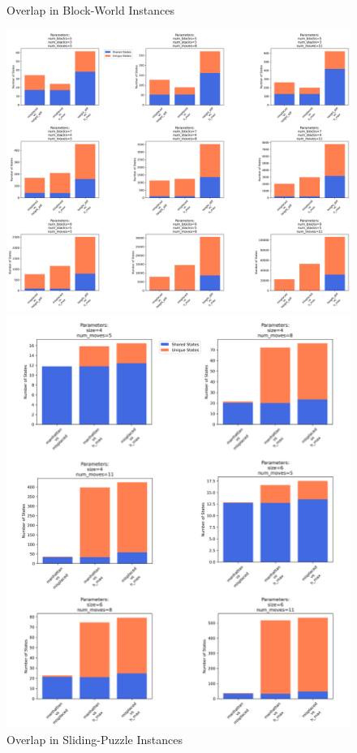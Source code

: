 \documentclass[letterpaper]{article}
\begin{document}
\begin{figure}[ht]
    \centering
    \begin{minipage}{0.57\textwidth} %
        \centering
        \caption*{Overlap in Block-World Instances}
        \includegraphics[width=\textwidth]{plots/blocks_world_state_overlap.png}
    \end{minipage}%
    \hfill
    \begin{minipage}{0.39\textwidth} %
        \centering
        \caption*{Overlap in Sliding-Puzzle Instances}
        \includegraphics[width=\textwidth]{plots/sliding_puzzle_state_overlap.png}

\end{minipage}
\end{figure}
\end{document}
